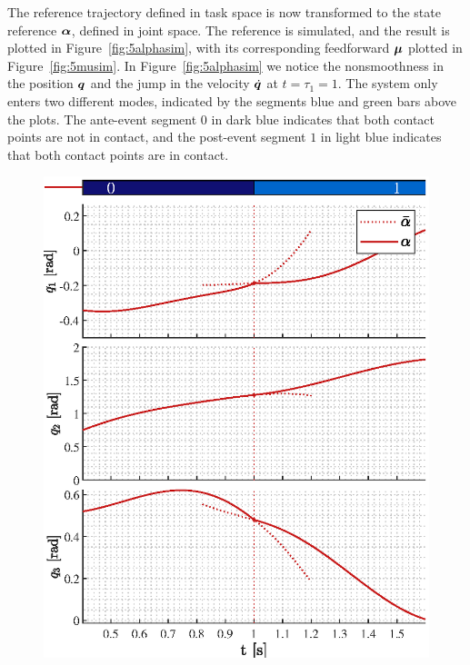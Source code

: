 \documentclass[../DC2019003Bouma.tex]{subfiles}
\begin{document}
The reference trajectory defined in task space is now transformed to the state reference $\boldsymbol{\alpha}$, defined in joint space. The reference is simulated, and the result is plotted in Figure~\ref{fig:5alphasim}, with its corresponding feedforward $\boldsymbol{\mu}$ plotted in Figure~\ref{fig:5musim}. In Figure~\ref{fig:5alphasim} we notice the nonsmoothness in the position ${\boldsymbol{q}}$ and the jump in the velocity $\dot{{\boldsymbol{q}}}$ at $t=\tau_1=1$. The system only enters two different modes, indicated by the segments blue and green bars above the plots. The ante-event segment $0$ in dark blue indicates that both contact points are not in contact, and the post-event segment $1$ in light blue indicates that both contact points are in contact.
\begin{figure}[bt!]
\centering
\begin{minipage}[c]{.48\textwidth}
\centering
\includegraphics[width=\textwidth]{alphapos.eps}
\end{minipage}
\begin{minipage}[c]{.48\textwidth}
\centering

\end{minipage}
\end{figure}
\end{document}
